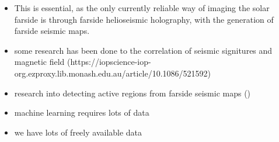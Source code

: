 \documentclass[11pt,a4paper,onecolumn]{report}
\begin{document}

\begin{itemize}
  \item This is essential, as the only currently reliable way of imaging the solar
  farside is through farside helioseismic holography, with the generation of
  farside seismic maps.
  \item some research has been done to the correlation of seismic signitures and
  magnetic field (https://iopscience-iop-org.ezproxy.lib.monash.edu.au/article/10.1086/521592)
  \item research into detecting active regions from farside seismic maps ()
\end{itemize}


\begin{itemize}
  \item machine learning requires lots of data
  \item we have lots of freely available data
\end{itemize}
\end{document}
